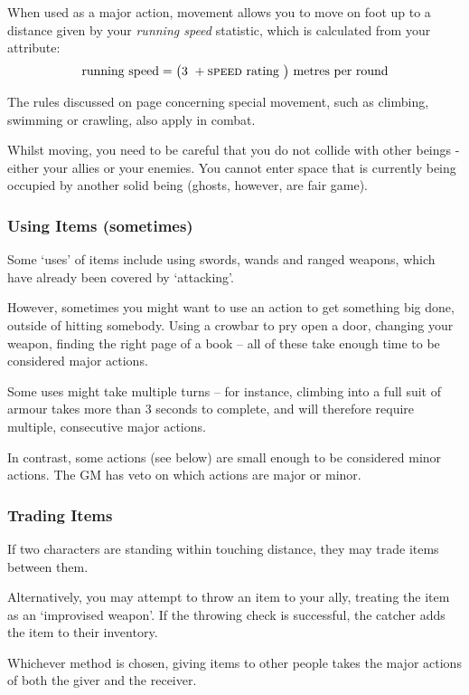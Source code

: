  When used as a major action, movement allows you to move on foot up to a distance given by your {\it running speed} statistic, which is calculated from your  attribute:
\small
$$ \text{running speed} = \big(\text{3 } + \text{\textsc{speed} rating }\big) \text{ metres per round} $$  
\normalsize

The rules discussed on page \pageref{S:SpecialMovement} concerning special movement, such as climbing, swimming or crawling, also apply in combat. 

Whilst moving, you need to be careful that you do not collide with other beings - either your allies or your enemies. You cannot enter space that is currently being occupied by another solid being (ghosts, however, are fair game). 

 \subsubsection{Using Items (sometimes)}
 
Some `uses' of items include using swords, wands and ranged weapons, which have already been covered by `attacking'. 

However, sometimes you might want to use an action to get something big done, outside of hitting somebody. Using a crowbar to pry open a door, changing your weapon, finding the right page of a book -- all of these take enough time to be considered major actions. 

Some uses might take multiple turns -- for instance, climbing into a full suit of armour takes more than 3 seconds to complete, and will therefore require multiple, consecutive major actions. 

In contrast, some actions (see below) are small enough to be considered minor actions. The GM has veto on which actions are major or minor. 

\subsubsection{Trading Items}

If two characters are standing within touching distance, they may trade items between them. 

Alternatively, you may attempt to throw an item to your ally, treating the item as an `improvised weapon'. If the throwing check is successful, the catcher adds the item to their inventory. 

Whichever method is chosen, giving items to other people takes the major actions of both the giver and the receiver. 


